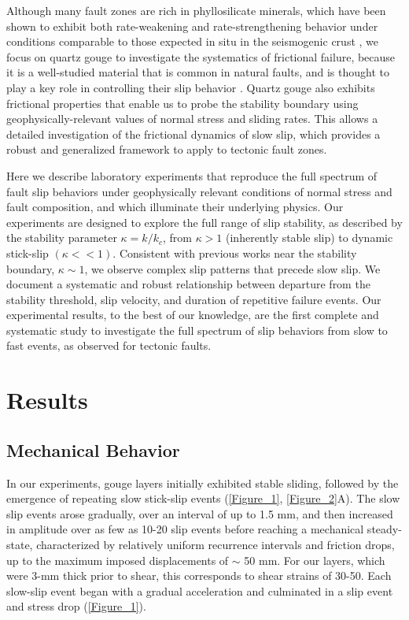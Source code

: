 Although many fault zones are rich in phyllosilicate minerals, which have been shown to exhibit both rate-weakening and rate-strengthening behavior under conditions comparable to those expected in situ in the seismogenic crust \cite{ide2007mechanism, saffer2001laboratory, den2013influence}, we focus on quartz gouge to investigate the systematics of frictional failure, because it is a well-studied material that is common in natural faults, and is thought to play a key role in controlling their slip behavior \cite{den2013influence, ikari2007effect}. Quartz gouge also exhibits frictional properties that enable us to probe the stability boundary using geophysically-relevant values of normal stress and sliding rates. This allows a detailed investigation of the frictional dynamics of slow slip, which provides a robust and generalized framework to apply to tectonic fault zones. 

Here we describe laboratory experiments that reproduce the full spectrum of fault slip behaviors under geophysically relevant conditions of normal stress and fault composition, and which illuminate their underlying physics. Our experiments are designed to explore the full range of slip stability, as described by the stability parameter $\kappa=k/k_c$, from $\kappa>1$ (inherently stable slip) to dynamic stick-slip $(\kappa<<1)$. Consistent with previous works \cite{baumberger1994crossover, scholz1972detailed, gu1984slip} near the stability boundary, $\kappa \sim 1$, we observe complex slip patterns that precede slow slip. We document a systematic and robust relationship between departure from the stability threshold, slip velocity, and duration of repetitive failure events. Our experimental results, to the best of our knowledge, are the first complete and systematic study to investigate the full spectrum of slip behaviors from slow to fast events, as observed for tectonic faults. 

\section{Results}
\subsection{Mechanical Behavior}
In our experiments, gouge layers initially exhibited stable sliding, followed by the emergence of repeating slow stick-slip events (\ref{Figure_1}, \ref{Figure_2}A). The slow slip events arose gradually, over an interval of up to 1.5 mm, and then increased in amplitude over as few as 10-20 slip events before reaching a mechanical steady-state, characterized by relatively uniform recurrence intervals and friction drops, up to the maximum imposed displacements of $\sim$ 50 mm.  For our layers, which were 3-mm thick prior to shear, this corresponds to shear strains of 30-50.  Each slow-slip event began with a gradual acceleration and culminated in a slip event and stress drop (\ref{Figure_1}). 


